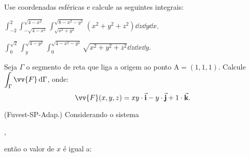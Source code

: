 \documentclass{ativmatUFRB}
\begin{document}
\begin{atividade}

\questao Use coordenadas esféricas e calcule as seguintes integrais:

\begin{itens}
 \item 
  $
   \displaystyle
   \int_{-2}^{2}\!
   \int_{-\sqrt{4 - x^2}}^{\sqrt{4 - x^2}}\!
   \int_{\sqrt{x^2 + y^2}}^{\sqrt{8 - x^2 - y^2}}{\left(x^2 + y^2 + z^2\right)\dd z\dd y\dd x}
  $. 
 \item 
  $
   \displaystyle
   \int_{0}^{\sqrt{2}}\!\!
   \int_{y}^{\sqrt{4 - y^2}}\!\!
   \int_{0}^{\sqrt{4 - x^2 - y^2}}{\sqrt{x^2 + y^2 + z^2}\dd z\dd x\dd y}
  $. 
 \Resp{$ \pi $}
\end{itens}
%
%
\questao Seja $\Gamma$ o segmento de reta que liga a origem ao ponto 
$\textrm{A} = (1,1,1)$. 
Calcule $\displaystyle \int_{\Gamma}\vv{F}\dd{\Gamma}$, onde:
\[
 \vv{F}(x,y,z) = xy\versor{i} - y\versor{j} + 1\versor{k}.
\]

%
\questao (Fuvest-SP-Adap.) Considerando o sistema 
\begin{center}
 , %
\end{center}
então o valor de $x$ é igual a:


\end{atividade}
\end{document}
